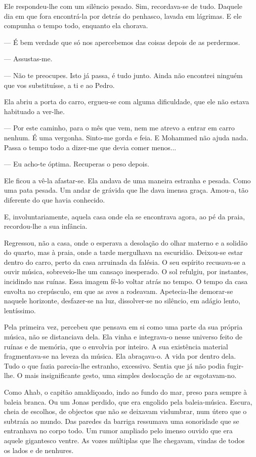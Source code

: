 Ele respondeu-lhe com um silêncio pesado. Sim, recordava-se de tudo.
Daquele dia em que fora encontrá-la por detrás do penhasco, lavada em
lágrimas. E ele compunha o tempo todo, enquanto ela chorava.

--- É bem verdade que só nos apercebemos das coisas depois de as
perdermos.

--- Assustas-me.

--- Não te preocupes. Isto já passa, é tudo junto. Ainda não encontrei
ninguém que vos substituísse, a ti e ao Pedro.

Ela abriu a porta do carro, ergueu-se com alguma dificuldade, que ele
não estava habituado a ver-lhe.

--- Por este caminho, para o mês que vem, nem me atrevo a entrar em carro
nenhum. É uma vergonha. Sinto-me gorda e feia. E Mohammed não ajuda
nada. Passa o tempo todo a dizer-me que devia comer menos...

--- Eu acho-te óptima. Recuperas o peso depois.

Ele ficou a vê-la afastar-se. Ela andava de uma maneira estranha e
pesada. Como uma pata pesada. Um andar de grávida que lhe dava imensa
graça. Amou-a, tão diferente do que havia conhecido.

E, involuntariamente, aquela casa onde ela se encontrava agora, ao pé da
praia, recordou-lhe a sua infância.

Regressou, não a casa, onde o esperava a desolação do olhar materno e a
solidão do quarto, mas à praia, onde a tarde mergulhava na escuridão.
Deixou-se estar dentro do carro, perto da casa arruinada da falésia. O
seu espírito recusava-se a ouvir música, sobreveio-lhe um cansaço
inesperado. O sol refulgiu, por instantes, incidindo nas ruínas. Essa
imagem fê-lo voltar atrás no tempo. O tempo da casa envolta no
crepúsculo, em que as aves a rodeavam. Apetecia-lhe demorar-se naquele
horizonte, desfazer-se na luz, dissolver-se no silêncio, em adágio
lento, lentíssimo.

Pela primeira vez, percebeu que pensava em si como uma parte da sua
própria música, não se distanciava dela. Ela vinha e integrava-o nesse
universo feito de ruínas e de memória, que o envolvia por inteiro. A sua
existência material fragmentava-se na leveza da música. Ela abraçava-o.
A vida por dentro dela. Tudo o que fazia parecia-lhe estranho,
excessivo. Sentia que já não podia fugir-lhe. O mais insignificante
gesto, uma simples deslocação de ar esgotavam-no.

Como Ahab, o capitão amaldiçoado, indo ao fundo do mar, preso para
sempre à baleia branca. Ou um Jonas perdido, que era engolido pela
baleia-música. Escura, cheia de escolhos, de objectos que não se
deixavam vislumbrar, num útero que o subtraía ao mundo. Das paredes da
barriga ressumava uma sonoridade que se entranhava no corpo todo. Um
rumor ampliado pelo imenso ouvido que era aquele gigantesco ventre. As
vozes múltiplas que lhe chegavam, vindas de todos os lados e de
nenhures.

